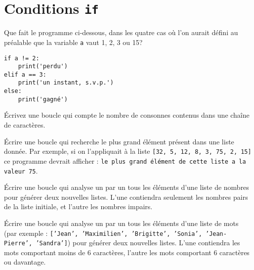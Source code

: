 
\section{Conditions \texttt{if}}

\begin{question}
Que fait le programme ci-dessous, dans les quatre cas où l'on aurait défini au
préalable que la variable \texttt{a} vaut 1, 2, 3 ou 15?
\begin{verbatim}
if a != 2: 
    print('perdu')
elif a == 3:
    print('un instant, s.v.p.')
else: 
    print('gagné')
\end{verbatim}
\end{question}

\begin{exercice}
Écrivez une boucle qui compte le nombre de consonnes contenus dans une chaîne de
caractères.
\end{exercice}

\begin{exercice}
Écrire une boucle qui recherche le plus grand élément présent dans une liste
donnée. Par exemple, si on l’appliquait à la liste \texttt{[32, 5, 12, 8, 3, 75,
2, 15]} ce programme devrait afficher : \texttt{le plus grand élément de cette liste a
la valeur 75}.
\end{exercice}

\begin{question}
Écrire une boucle qui analyse un par un tous les éléments d'une liste de nombres
pour générer deux nouvelles listes. L'une contiendra seulement les nombres pairs
de la liste initiale, et l'autre les nombres impairs.
\end{question}

\begin{exercice}
Écrire une boucle qui analyse un par un tous les éléments d’une liste de mots
(par exemple : \texttt{['Jean', 'Maximilien', 'Brigitte', 'Sonia',
'Jean-Pierre', 'Sandra']}) pour générer deux nouvelles listes. L’une contiendra
les mots comportant moins de 6 caractères, l’autre les mots comportant 6
caractères ou davantage.
\end{exercice}


